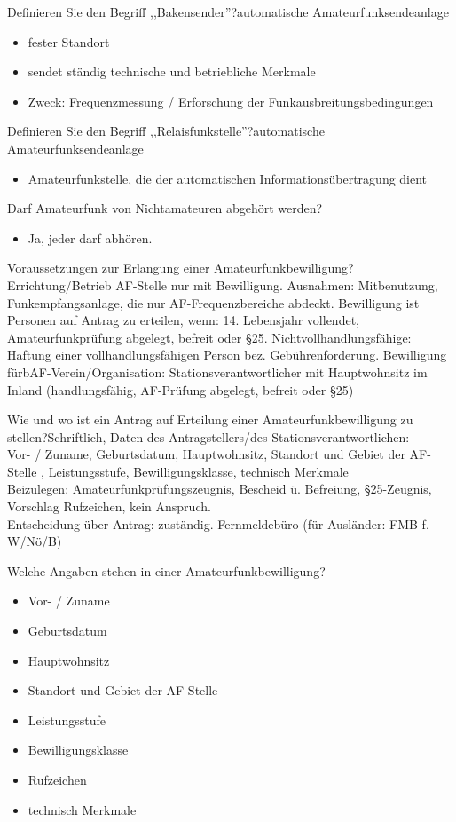 \documentclass[avery5371,grid,frame,a4paper]{flashcards}
\newcommand{\card}[3]{
  \begin{flashcard}[{\chap} -- #1]{#2}#3\end{flashcard}
}
\begin{document}
\card{23}{Definieren Sie den Begriff ,,Bakensender''?}{automatische Amateurfunksendeanlage\begin{itemize}\itemsep1pt \item fester Standort \item sendet ständig technische und betriebliche Merkmale \item Zweck: Frequenzmessung / Erforschung der Funkausbreitungsbedingungen\end{itemize}}

\card{24}{Definieren Sie den Begriff ,,Relaisfunkstelle''?}{automatische Amateurfunksendeanlage\begin{itemize}\itemsep1pt \item Amateurfunkstelle, die der automatischen Informationsübertragung dient\end{itemize}}

\card{25}{ Darf Amateurfunk von Nichtamateuren abgehört werden?}{\begin{itemize}\itemsep1pt \item Ja, jeder darf abhören.\end{itemize}}

\card{26}{Voraussetzungen zur Erlangung einer Amateurfunkbewilligung?}{Errichtung/Betrieb AF-Stelle nur mit Bewilligung. Ausnahmen:  Mitbenutzung, Funkempfangsanlage, die nur AF-Frequenzbereiche abdeckt. Bewilligung ist Personen auf Antrag zu erteilen, wenn: 14. Lebensjahr vollendet, Amateurfunkprüfung abgelegt, befreit oder §25. Nichtvollhandlungsfähige: Haftung einer vollhandlungsfähigen Person bez. Gebührenforderung. Bewilligung fürbAF-Verein/Organisation: Stationsverantwortlicher mit Hauptwohnsitz im Inland (handlungsfähig, AF-Prüfung abgelegt, befreit oder §25)}

\card{27}{Wie und wo ist ein Antrag auf Erteilung einer Amateurfunkbewilligung zu stellen?}{Schriftlich, Daten des Antragstellers/des Stationsverantwortlichen:\\ Vor- / Zuname, Geburtsdatum, Hauptwohnsitz, Standort und Gebiet der AF-Stelle , Leistungsstufe, Bewilligungsklasse, technisch Merkmale \\ Beizulegen: Amateurfunkprüfungszeugnis, Bescheid ü. Befreiung, §25-Zeugnis, Vorschlag Rufzeichen, kein Anspruch. \\ Entscheidung über Antrag: zuständig. Fernmeldebüro (für Ausländer: FMB f. W/Nö/B)}

\card{28}{Welche Angaben stehen in einer Amateurfunkbewilligung?}{\begin{itemize}\itemsep0pt \item Vor- / Zuname \item Geburtsdatum \item Hauptwohnsitz \item Standort und Gebiet der AF-Stelle \item Leistungsstufe \item Bewilligungsklasse \item Rufzeichen \item technisch Merkmale\end{itemize}}
\end{document}

